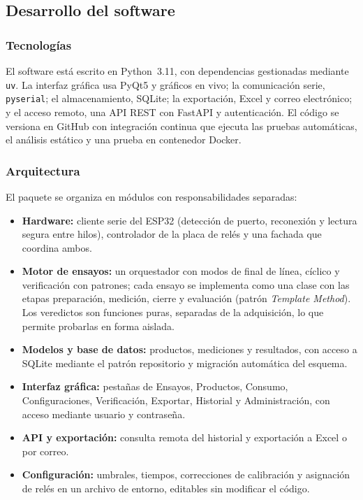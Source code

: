 \subsection{Desarrollo del software}
\label{subsec:metodologia_sw}

\subsubsection{Tecnologías}

El software está escrito en Python~3.11, con dependencias gestionadas mediante
\texttt{uv}. La interfaz gráfica usa PyQt5 y gráficos en vivo; la comunicación
serie, \texttt{pyserial}; el almacenamiento, SQLite; la exportación, Excel y correo
electrónico; y el acceso remoto, una API REST con FastAPI y autenticación. El
código se versiona en GitHub con integración continua que ejecuta las pruebas
automáticas, el análisis estático y una prueba en contenedor Docker.

\subsubsection{Arquitectura}

El paquete se organiza en módulos con responsabilidades separadas:
\begin{itemize}
    \item \textbf{Hardware:} cliente serie del ESP32 (detección de puerto,
          reconexión y lectura segura entre hilos), controlador de la placa de
          relés y una fachada que coordina ambos.
    \item \textbf{Motor de ensayos:} un orquestador con modos de final de línea,
          cíclico y verificación con patrones; cada ensayo se implementa como una
          clase con las etapas preparación, medición, cierre y evaluación
          (patrón \emph{Template Method}). Los veredictos son funciones puras,
          separadas de la adquisición, lo que permite probarlas en forma aislada.
    \item \textbf{Modelos y base de datos:} productos, mediciones y resultados,
          con acceso a SQLite mediante el patrón repositorio y migración
          automática del esquema.
    \item \textbf{Interfaz gráfica:} pestañas de Ensayos, Productos, Consumo,
          Configuraciones, Verificación, Exportar, Historial y Administración,
          con acceso mediante usuario y contraseña.
    \item \textbf{API y exportación:} consulta remota del historial y exportación
          a Excel o por correo.
    \item \textbf{Configuración:} umbrales, tiempos, correcciones de calibración
          y asignación de relés en un archivo de entorno, editables sin modificar
          el código.
\end{itemize}

